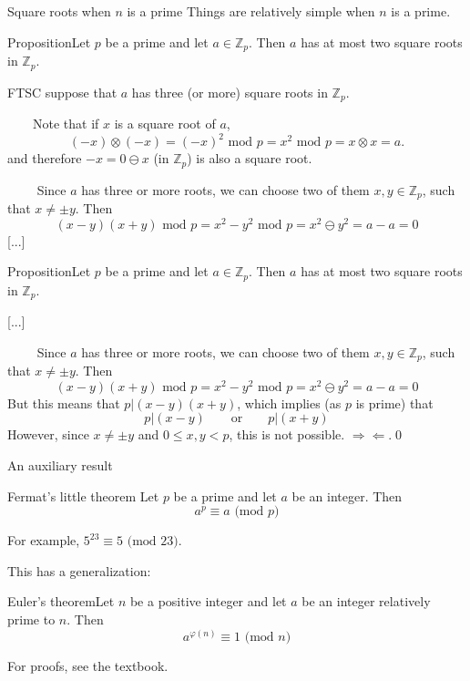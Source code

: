 \documentclass{beamer}
\def\bl[#1]#2{\begin{block}{#1}#2\end{block}}
\begin{document}

\begin{frame}{Square roots when $n$ is a prime}
Things are relatively simple when $n$ is a prime.
\bl[Proposition]{Let $p$ be a prime and let $a\in\mathbb{Z}_p$. Then $a$ has at most two square roots in $\mathbb{Z}_p$.}
FTSC suppose that $a$ has three (or more) square roots in $\mathbb{Z}_p$. 

~~~~Note that if $x$ is a square root of $a$,
\[
(-x)\otimes (-x)=(-x)^2\textrm{ mod }p=x^2\textrm{ mod }p=x\otimes x = a.
\]
and therefore $-x=0\ominus x$ (in $\mathbb{Z}_p$) is also a square root.

~~~~ Since $a$ has three or more roots, we can choose two of them $x,y\in\mathbb{Z}_p$, such that $x\neq \pm y$. Then
\[
(x-y)(x+y)\textrm{ mod $p$}=x^2-y^2\textrm{ mod $p$}= x^2\ominus y^2=a-a=0
\]
[...]
\end{frame}

\begin{frame}
\bl[Proposition]{Let $p$ be a prime and let $a\in\mathbb{Z}_p$. Then $a$ has at most two square roots in $\mathbb{Z}_p$.}
[...]

~~~~ Since $a$ has three or more roots, we can choose two of them $x,y\in\mathbb{Z}_p$, such that $x\neq \pm y$. Then
\[
(x-y)(x+y)\textrm{ mod $p$}=x^2-y^2\textrm{ mod $p$}= x^2\ominus y^2=a-a=0
\]
But this means that $p|(x-y)(x+y)$, which implies (as $p$ is prime) that
\[
p|(x-y)\qquad\textrm{or}\qquad p|(x+y)
\]
However, since $x\neq \pm y$ and $0\leq x,y<p$, this is not possible. $\Rightarrow\Leftarrow$.\qed
\end{frame}

\begin{frame}{An auxiliary result}
\bl[Fermat's little theorem]{
Let $p$ be a prime and let $a$ be an integer. Then
\[
a^p\equiv a\textrm{ (mod $p$)}
\]}
For example, $5^{23}\equiv 5\textrm{ (mod 23)}$.
\vspace{0.5cm}

This has a generalization:

\bl[Euler's theorem]{Let $n$ be a positive integer and let $a$ be an integer relatively prime to $n$. Then
\[
a^{\varphi(n)}\equiv 1\textrm{ (mod $n$)}
\]}
For proofs, see the textbook.
\end{frame}
\end{document}
